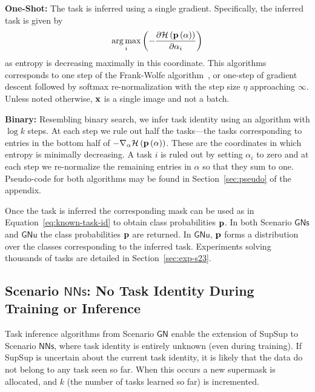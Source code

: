 \documentclass{article}
\DeclareMathOperator*{\argmax}{arg\,max}
\newcommand{\ac}{SupSup\xspace}
\newcommand{\casename}[1]{\ensuremath{\mathsf{#1}}\xspace}
\newcommand{\secref}[1]{Section~\ref{sec:#1}}
\begin{document}
\textbf{One-Shot:}
The task is inferred using a single gradient. Specifically, the inferred task is given by
\begin{equation} \label{eq:oneshot}
    \argmax_i  \round{- \frac{ \partial \Hcal\round{\p \round{\alpha}}}{\partial \alpha_i}}
\end{equation}
as entropy is decreasing maximally in this coordinate. This algorithms corresponds to one step of the Frank-Wolfe algorithm~\cite{frank1956algorithm}, or one-step of gradient descent followed by softmax re-normalization with the step size $\eta$ approaching $\infty$. Unless noted otherwise, $\mathbf{x}$ is a single image and not a batch.

\textbf{Binary:}
Resembling binary search, we infer task identity using an algorithm with $\log k$ steps. At each step we rule out half the tasks---the tasks corresponding to entries in the bottom half of $ - \nabla_\alpha \mathcal{H}\left( \mathbf{p} \left( \alpha \right) \right)$. These are the coordinates in which entropy is minimally decreasing. A task $i$ is ruled out by setting $\alpha_i$ to zero and at each step we re-normalize the remaining entries in $\alpha$ so that they sum to one. Pseudo-code for both algorithms may be found in Section~\ref{sec:pseudo} of the appendix.

Once the task is inferred the corresponding mask can be used as in Equation~\ref{eq:known-task-id} to obtain class probabilities $\mathbf{p}$. In both Scenario \casename{GNs} and \casename{GNu} the class probabilities $\mathbf{p}$ are returned. In \casename{GNu}, $\mathbf{p}$ forms a distribution over the classes corresponding to the inferred task. Experiments solving thousands of tasks are detailed in \secref{exp-s23}.

\subsection{Scenario \casename{NNs}: No Task Identity During Training or Inference} \label{sec:S4}
Task inference algorithms from Scenario \casename{GN} enable the extension of \ac to Scenario \casename{NNs}, where task identity is entirely unknown (even during training). If \ac is uncertain about the current task identity, it is likely that the data do not belong to any task seen so far. When this occurs a new supermask is allocated, and $k$ (the number of tasks learned so far) is incremented. %
\end{document}
